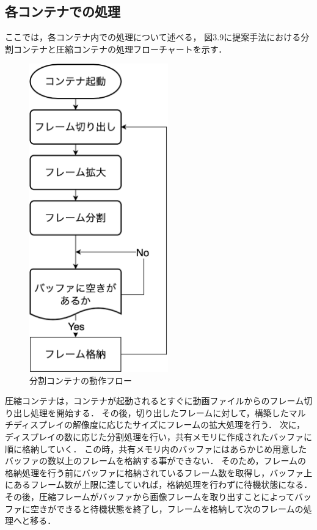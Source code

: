 \subsection*{各コンテナでの処理}
ここでは，各コンテナ内での処理について述べる，
図3.9に提案手法における分割コンテナと圧縮コンテナの処理フローチャートを示す．

\begin{figure}[H]
    \hspace*{\fill}
    \includegraphics[width=60mm]{./fig/chap3/bunkatu_flow.eps}
    \hspace*{\fill}
    \caption{分割コンテナの動作フロー}
\end{figure}

圧縮コンテナは，コンテナが起動されるとすぐに動画ファイルからのフレーム切り出し処理を開始する．
その後，切り出したフレームに対して，構築したマルチディスプレイの解像度に応じたサイズにフレームの拡大処理を行う．
次に，ディスプレイの数に応じた分割処理を行い，共有メモリに作成されたバッファに順に格納していく．
この時，共有メモリ内のバッファにはあらかじめ用意したバッファの数以上のフレームを格納する事ができない．
そのため，フレームの格納処理を行う前にバッファに格納されているフレーム数を取得し，バッファ上にあるフレーム数が上限に達していれば，格納処理を行わずに待機状態になる．
その後，圧縮フレームがバッファから画像フレームを取り出すことによってバッファに空きができると待機状態を終了し，フレームを格納して次のフレームの処理へと移る．


